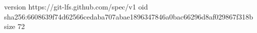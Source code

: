 version https://git-lfs.github.com/spec/v1
oid sha256:6608639f74d62566cedaba707abae1896347846a0bac66296d8af029867f318b
size 72
